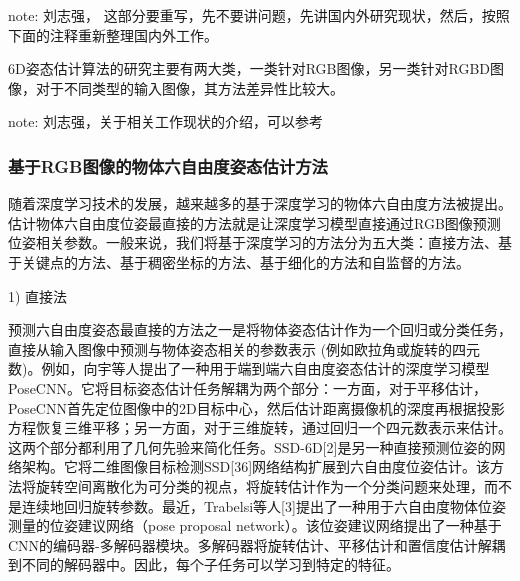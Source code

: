 \documentclass[12pt]{article}
\newcommand{\note}[1]{\textcolor[rgb]{0.6,0,0}{note: #1}}
\begin{document}
\note{刘志强， 这部分要重写，先不要讲问题，先讲国内外研究现状，然后，按照下面的注释重新整理国内外工作。}

6D姿态估计算法的研究主要有两大类，一类针对RGB图像\cite{Marullo2022}，另一类针对RGBD图像\cite{Sahin2019}，对于不同类型的输入图像，其方法差异性比较大\cite{ZhangShaoBoPhd}。

\note{刘志强，关于相关工作现状的介绍，可以参考\cite{ZhangShaoBoPhd}}



\subsubsection{基于RGB图像的物体六自由度姿态估计方法}

随着深度学习技术的发展，越来越多的基于深度学习的物体六自由度方法被提出。估计物体六自由度位姿最直接的方法就是让深度学习模型直接通过RGB图像预测位姿相关参数。一般来说，我们将基于深度学习的方法分为五大类：直接方法、基于关键点的方法、基于稠密坐标的方法、基于细化的方法和自监督的方法。

1) 直接法

预测六自由度姿态最直接的方法之一是将物体姿态估计作为一个回归或分类任务，直接从输入图像中预测与物体姿态相关的参数表示 (例如欧拉角或旋转的四元数)。例如，向宇等人\cite{Xiang2018}提出了一种用于端到端六自由度姿态估计的深度学习模型PoseCNN。它将目标姿态估计任务解耦为两个部分：一方面，对于平移估计，PoseCNN首先定位图像中的2D目标中心，然后估计距离摄像机的深度再根据投影方程恢复三维平移；另一方面，对于三维旋转，通过回归一个四元数表示来估计。这两个部分都利用了几何先验来简化任务。SSD-6D[2]是另一种直接预测位姿的网络架构。它将二维图像目标检测SSD[36]网络结构扩展到六自由度位姿估计。该方法将旋转空间离散化为可分类的视点，将旋转估计作为一个分类问题来处理，而不是连续地回归旋转参数。最近，Trabelsi等人[3]提出了一种用于六自由度物体位姿测量的位姿建议网络（pose proposal network）。该位姿建议网络提出了一种基于CNN的编码器-多解码器模块。多解码器将旋转估计、平移估计和置信度估计解耦到不同的解码器中。因此，每个子任务可以学习到特定的特征。
\end{document}
